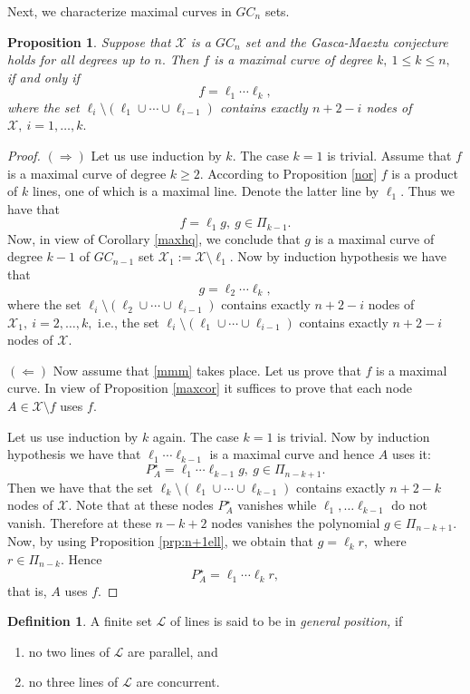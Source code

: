 \documentclass[a4paper,12pt]{article}
\newtheorem{proposition}[lemma]{Proposition}
\theoremstyle{definition}
\newtheorem{definition}[lemma]{Definition}
\numberwithin{equation}{section}
\numberwithin{figure}{section}
\newcommand{\Lset}{\mathcal{L}}
\newcommand{\Xset}{\mathcal{X}}
\begin{document}
Next, we characterize maximal curves in $GC_n$ sets.
\begin{proposition} \label{nor2} Suppose that $\Xset$ is a $GC_n$ set and the Gasca-Maeztu conjecture  holds for all degrees up to $n.$ Then  $f$ is a maximal curve of degree $k,\ 1\le k\le n,$ if and only if
\begin{equation}\label{mmm} f=\ell_1\cdots\ell_k,
\end{equation}
where the set $\ell_i\setminus (\ell_1\cup\cdots\cup\ell_{i-1})$ contains exactly $n+2-i$ nodes of $\Xset,\ i=1,\ldots, k.$ 
\end{proposition}
\begin{proof} $(\Rightarrow)$ Let us use induction by $k.$ The case $k=1$ is trivial.
Assume that $f$ is a maximal curve of degree $k\ge 2.$ According to Proposition \ref{nor} $f$ is a product of $k$ lines, one of which is a maximal line. Denote the latter line by $\ell_1.$ Thus we have that
$$f=\ell_1 g,\ g\in \Pi_{k-1}.$$
Now, in view of Corollary \ref{maxhq}, we conclude that $g$ is a maximal curve of degree $k-1$ of $GC_{n-1}$ set $\Xset_1:=\Xset\setminus \ell_1.$  Now by induction hypothesis we have that
$$g=\ell_2\cdots\ell_k,$$
where the set $\ell_i\setminus (\ell_2\cup\cdots\cup\ell_{i-1})$ contains exactly $n+2-i$ nodes of $\Xset_1,\ i=2,\ldots, k,$ i.e.,  the set $\ell_i\setminus (\ell_1\cup\cdots\cup\ell_{i-1})$ contains exactly $n+2-i$ nodes of $\Xset.$

$(\Leftarrow)$
Now assume that \eqref{mmm} takes place. Let us prove that $f$ is a maximal curve.
In view of Proposition \ref{maxcor} it suffices to prove that each node $A\in \Xset\setminus f$ uses $f.$ 

Let us use induction by $k$ again. The case $k=1$ is trivial.
Now by induction hypothesis we have that $\ell_1\cdots\ell_{k-1}$ is a maximal curve and hence $A$ uses it:
$$P^\star_A=\ell_1\cdots\ell_{k-1}g,\ g\in\Pi_{n-k+1}.$$
Then we have that the set $\ell_k\setminus (\ell_1\cup\cdots\cup\ell_{k-1})$ contains exactly $n+2-k$ nodes of $\Xset.$ Note that at these nodes $P^\star_A$ vanishes while $\ell_1, \ldots\ell_{k-1}$ do not vanish. Therefore at these $n-k+2$ nodes vanishes the polynomial $g\in\Pi_{n-k+1}.$
Now, by using Proposition \ref{prp:n+1ell}, we obtain that $g=\ell_k r,$ where $r\in\Pi_{n-k}.$ Hence 
$$P^\star_A=\ell_1\cdots\ell_k r,$$
that is, $A$ uses $f.$\end{proof}

\begin{definition} A finite set $\Lset$ of lines is said to be in \emph{general position,} if 
\begin{enumerate}
\item
no two lines of $\Lset$ are parallel, and 
\item
no three lines of $\Lset$ are concurrent.
\end{enumerate}
\end{definition}
\end{document}
